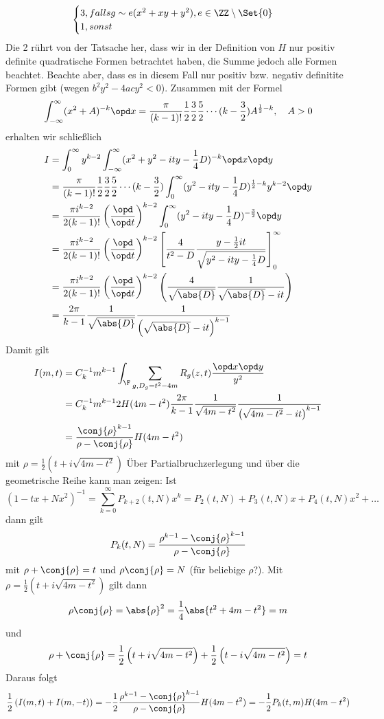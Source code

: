 \begin{bewe}
\[\begin{cases}
	3, falls g \sim e(x^2 + xy + y^2), e \in \ZZ \setminus \Set {0}	\\
	1, sonst
	\end{cases}
\]
Die 2 rührt von der Tatsache her, dass wir in der Definition von $H$ nur positiv definite quadratische Formen betrachtet haben, die Summe jedoch alle Formen beachtet. Beachte aber, dass es in diesem Fall nur positiv bzw. negativ definitite Formen gibt (wegen $b^2y^2 - 4acy^2 < 0$). Zusammen mit der Formel
\[
	\int_{-\infty}^\infty (x^2 + A)^{-k} \opd x = \frac \pi{(k-1)!} \frac 12 \frac 32 \frac 52 \cdots (k-\frac 32) A^{\frac 12 -k}, \quad A > 0
\]
erhalten wir schließlich
\begin{align*}
	I &= \int_0^\infty y^{k-2} \int_{-\infty}^\infty (x^2 + y^2 - ity - \frac 14 D)^{-k} \opd x \opd y \\
	&= \frac \pi{(k-1)!} \frac 12 \frac 32 \frac 52 \cdots (k-\frac 32) \int_0^\infty (y^2 - ity - \frac 14 D)^{\frac 12 - k} y^{k-2} \opd y \\
	&= \frac{\pi i^{k-2}}{2(k-1)!} \left( \frac {\opd}{\opd t} \right)^{k-2} \int_0^\infty (y^2 - ity - \frac 14D)^{-\frac 32} \opd y \\
	&= \frac{\pi i^{k-2}}{2(k-1)!} \left( \frac {\opd}{\opd t} \right)^{k-2} \left[ \frac{4}{t^2 - D} \frac{y - \frac 12 it}{\sqrt{y^2 - ity - \frac 14 D}} \right]_0^\infty \\
	&= \frac{\pi i^{k-2}}{2(k-1)!} \left( \frac {\opd}{\opd t} \right)^{k-2} \left( \frac 4{\sqrt{\abs{D}}} \frac 1{\sqrt{\abs{D}} - it} \right) \\
	&= \frac {2\pi}{k-1} \frac 1{\sqrt{\abs{D}}} \frac 1{\left( \sqrt{\abs{D}} - it \right)^{k-1}}
\end{align*}
Damit gilt
\begin{align*}
	I(m, t) &= C_k^{-1} m^{k-1} \int_\F \sum_{g, D_g = t^2-4m} R_g(z,t) \frac {\opd x \opd y}{y^2} \\
	&= C_k^{-1} m^{k-1} 2 H (4m-t^2) \frac {2\pi}{k-1} \frac 1{\sqrt{4m-t^2}} \frac 1{\left( \sqrt{4m-t^2} - it \right)^{k-1}} \\
	&= \frac{\conj{\rho}^{k-1}}{\rho - \conj{\rho}} H(4m-t^2)
\end{align*}
mit $\rho = \frac 12 \left( t + i \sqrt{4m-t^2} \right)$
Über Partialbruchzerlegung und über die geometrische Reihe kann man zeigen: Ist
\[
	(1 - tx + Nx^2)^{-1} = \sum_{k=0}^\infty P_{k+2}(t,N)x^k = P_2(t,N) + P_3(t,N)x + P_4(t,N)x^2 + \ldots
\]
dann gilt
\[
	P_k(t,N) = \frac{\rho^{k-1} - \conj{\rho}^{k-1}}{\rho - \conj{\rho}}
\]
mit $\rho + \conj{\rho} = t$ und $\rho \conj{\rho} = N$ (für beliebige $\rho$?). Mit $\rho = \frac 12 \left( t + i \sqrt{4m-t^2} \right)$ gilt dann
\[
	\rho \conj{\rho} = \abs{\rho}^2 = \frac 14 \abs{t^2 + 4m - t^2} = m
\]
und 
\[
	\rho + \conj{\rho} = \frac 12 \left( t + i \sqrt{4m-t^2} \right) + \frac 12 \left( t - i \sqrt{4m-t^2} \right) = t
\]
Daraus folgt
\[
	\frac 12 \left( I(m,t) + I(m,-t) \right) = - \frac 12 \frac{\rho^{k-1} - \conj{\rho}^{k-1}}{\rho - \conj{\rho}} H(4m-t^2) = - \frac 12 P_k(t,m) H(4m-t^2)
\]


\end{bewe}

